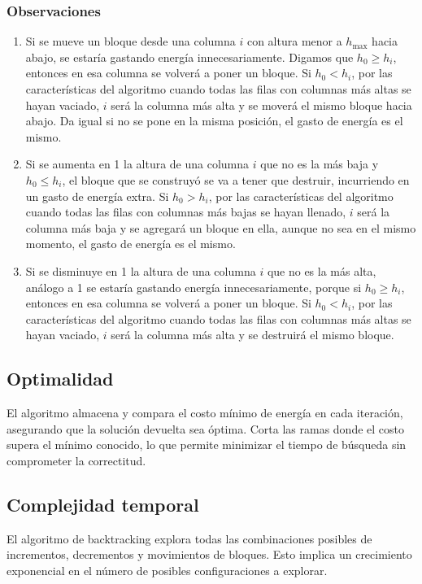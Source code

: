 \documentclass[a4paper,12pt]{article}
\begin{document}
\subsubsection{Observaciones}
\begin{enumerate}
	\item Si se mueve un bloque desde una columna \( i \) con altura menor a \( h_{\text{max}} \) hacia abajo, se estaría gastando energía innecesariamente. Digamos que \( h_0 \geq h_i \), entonces en esa columna se volverá a poner un bloque. Si \( h_0 < h_i \), por las características del algoritmo cuando todas las filas con columnas más altas se hayan vaciado, \( i \) será la columna más alta y se moverá el mismo bloque hacia abajo. Da igual si no se pone en la misma posición, el gasto de energía es el mismo.
	\item Si se aumenta en 1 la altura de una columna \( i \) que no es la más baja y \( h_0 \leq h_i \), el bloque que se construyó se va a tener que destruir, incurriendo en un gasto de energía extra. Si \( h_0 > h_i \), por las características del algoritmo cuando todas las filas con columnas más bajas se hayan llenado, \( i \) será la columna más baja y se agregará un bloque en ella, aunque no sea en el mismo momento, el gasto de energía es el mismo.
	\item Si se disminuye en 1 la altura de una columna \( i \) que no es la más alta, análogo a 1 se estaría gastando energía innecesariamente, porque si \( h_0 \geq h_i \), entonces en esa columna se volverá a poner un bloque. Si \( h_0 < h_i \), por las características del algoritmo cuando todas las filas con columnas más altas se hayan vaciado, \( i \) será la columna más alta y se destruirá el mismo bloque.
\end{enumerate}


\subsection{Optimalidad}

El algoritmo almacena y compara el costo mínimo de energía en cada iteración, asegurando que la solución devuelta sea óptima. Corta las ramas donde el costo supera el mínimo conocido, lo que permite minimizar el tiempo de búsqueda sin comprometer la correctitud.

\subsection{Complejidad temporal}
El algoritmo de backtracking explora todas las combinaciones posibles de incrementos, decrementos y movimientos de bloques. Esto implica un crecimiento exponencial en el número de posibles configuraciones a explorar.
\end{document}
